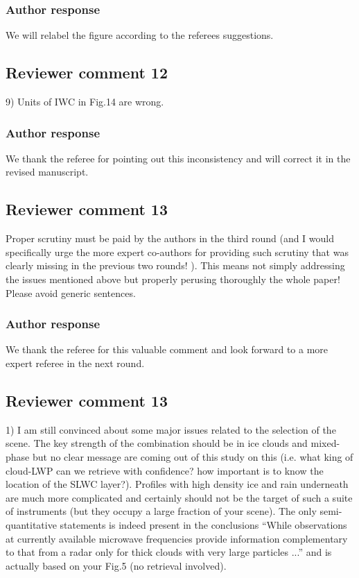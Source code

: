 \begin{description}
\subsubsection{Author response}

We will relabel the figure according to the referees suggestions.


\subsection*{Reviewer comment 12}

9) Units of IWC in Fig.14 are wrong.

\subsubsection{Author response}

We thank the referee for pointing out this inconsistency and will correct it in the
revised manuscript.

\subsection*{Reviewer comment 13}

Proper scrutiny must be paid by the authors in the third round (and I would
specifically urge the more expert co-authors for providing such scrutiny that
was clearly missing in the previous two rounds! ). This means not simply
addressing the issues mentioned above but properly perusing thoroughly the whole
paper! Please avoid generic sentences.

\subsubsection{Author response}

We thank the referee for this valuable comment and look forward to a more expert
referee in the next round.

\subsection*{Reviewer comment 13}

1) I am still convinced about some major issues related to the selection of the
scene. The key strength of the combination should be in ice clouds and
mixed-phase but no clear message are coming out of this study on this (i.e. what
king of cloud-LWP can we retrieve with confidence? how important is to know the
location of the SLWC layer?). Profiles with high density ice and rain underneath
are much more complicated and certainly should not be the target of such a suite
of instruments (but they occupy a large fraction of your scene). The only
semi-quantitative statements is indeed present in the conclusions ``While
observations at currently available microwave frequencies provide information
complementary to that from a radar only for thick clouds with very large
particles ...'' and is actually based on your Fig.5 (no retrieval involved).


\end{description}
